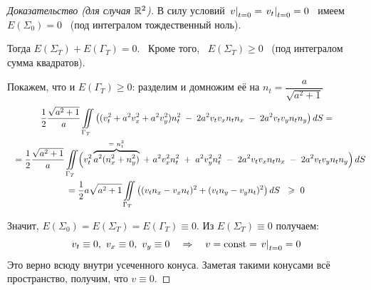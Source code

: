 \documentclass[../main.tex]{subfiles}
\begin{document}
\begin{proof}[Доказательство (для случая $\mathbb{R}^2$)]
В силу условий $ \left. v\right|_{t=0} = \left. v_t\right|_{t=0} = 0$ \ имеем \ $ E(\Sigma_0)=0 $ \ (под интегралом тождественный ноль).

Тогда $ E(\Sigma_T)+E(\Gamma_T)=0 $. \ 
Кроме того, \ $ E(\Sigma_T)\geq 0 $ \ (под интегралом сумма квадратов).
\vspace{0.5em}

Покажем, что и $ E(\Gamma_T)\geq 0 $: разделим и домножим её на $ n_t=\dfrac{a}{\sqrt{a^2+1}} $
\begin{multline*}
  \frac{1}{2}\frac{\sqrt{a^2+1}}{a}\iint\limits_{\Gamma_T}\roundBr{(v^2_t+a^2v^2_x+a^2v^2_y)n^2_t \; - \; 2a^2v_tv_xn_tn_x \; - \; 2a^2v_tv_yn_tn_y} dS = \\ \shoveleft{
  =\frac{1}{2}\frac{\sqrt{a^2+1}}{a}\iint\limits_{\Gamma_T} \Bigl( v^2_t \overbrace{a^2(n^2_x + n^2_y)}^\text{= $n_t^2$}\; + \; a^2v^2_xn^2_t \; + \; a^2v^2_yn^2_t\; - \; 2a^2v_tv_xn_tn_x \; - \; 2a^2 v_t v_y n_t n_y \Bigr)\, dS }\\
  = \frac{1}{2} a \sqrt{a^2+1} \iint\limits_{\Gamma_T} \roundBr{(v_tn_x -v_xn_t)^2+(v_tn_y-v_yn_t)^2} dS \;\ \geq\ 0  
\end{multline*}

Значит,\; $ E(\Sigma_0)=E(\Sigma_T)=E(\Gamma_T)\equiv 0.$
\; Из $ E(\Sigma_T)\equiv 0 $ получаем: 
$$ v_t\equiv 0,\ v_x\equiv 0,\ v_y\equiv 0 \quad \Rightarrow \quad v = \text{const} = \while{v}{t=0} = 0 
$$
Это верно всюду внутри усеченного конуса.
Заметая такими конусами всё пространство, получим, что $ v \equiv 0 $.
\end{proof}
\end{document}
